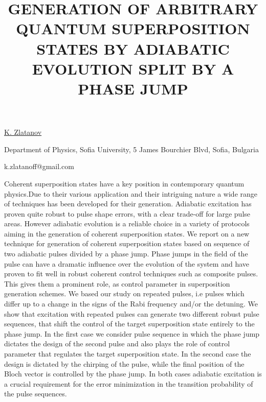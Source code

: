 \title{GENERATION OF ARBITRARY QUANTUM SUPERPOSITION STATES BY ADIABATIC EVOLUTION SPLIT BY A PHASE JUMP}

\underline{K. Zlatanov}  

{\normalsize{\vspace{-4mm}
Department of Physics, Sofia University, 5 James Bourchier Blvd, Sofia, Bulgaria



\email k.zlatanoff@gmail.com}}

Coherent superposition states have a key position in contemporary quantum physics.Due to their various 
application and their intriguing nature a wide range of techniques has been developed for their generation.
Adiabatic excitation has proven quite robust to pulse shape errors, with a clear trade-off for large pulse areas. However adiabatic evolution is a reliable choice in a 
variety of protocols aiming in the generation of coherent superposition states.  
We report on a new technique for generation of coherent superposition states based on sequence of two
adiabatic pulses divided by a phase jump. Phase jumps in the field of the pulse can have a dramatic
influence over the evolution of the system and have proven to fit well in robust coherent control techniques such
as composite pulses. This gives them a prominent role,
as control parameter in superposition generation schemes. We based our study on repeated pulses, i.e pulses which differ up to a change in the signs of the Rabi frequency and/or the detuning. We show that excitation with repeated
pulses can generate two different robust pulse sequences, that shift the control of the target superposition state
entirely to the phase jump. In the first case we consider pulse sequence in which the phase jump dictates the
design of the second pulse and also plays the role of control parameter that regulates the target superposition
state. In the second case the design is dictated by the chirping of the pulse, while the final position of the Bloch
vector is controlled by the phase jump. In both cases adiabatic excitation is a crucial requirement for the error
minimization in the transition probability of the pulse sequences.

\vspace{\baselineskip}